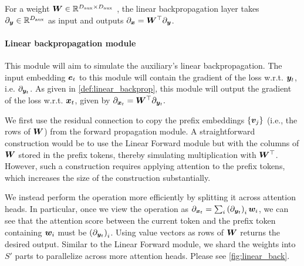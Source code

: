 \begin{definition}\label{def:linear_backprop}
    For a weight ${\bm{W}}\in\mathbb{R}^{ D_{\text{aux}}  \times D_{\text{aux}} }$ , the linear backpropagation layer takes $\partial_{ {\bm{y}} } \in\mathbb{R}^{ D_{\text{aux}} }$ as input and outputs $\partial_{{\bm{x}}} = {\bm{W}}^{\top} \partial_{{\bm{y}}}$.
\end{definition}


\paragraph{\simulator{} Linear backpropagation module} 
This module will aim to simulate the auxiliary's linear backpropagation.
The input embedding $\ve_t$ to this module will contain the gradient of the loss w.r.t. ${\bm{y}}_t$, i.e. $\partial_{  {\bm{y}}_t }$. As given in \cref{def:linear_backprop}, this module will output the gradient of the loss w.r.t. ${\bm{x}}_t$, given by $\partial_{{\bm{x}}_t} = {\bm{W}}^{\top} \partial_{{\bm{y}}_t}.$ 

We first use the residual connection to copy the prefix embeddings $\{ {\bm{v}}_j \}$ (i.e., the rows of ${\bm{W}}$) from the forward propagation module.
A straightforward construction would be to use the Linear Forward module but with the columns of ${\bm{W}}$ stored in the prefix tokens, thereby simulating multiplication with ${\bm{W}}^\top$.
However, such a construction requires applying attention to the prefix tokens, which increases the size of the construction substantially.

We instead perform the operation more efficiently by splitting it across attention heads. In particular, once we view the operation as $\partial_{ {\bm{x}}_t } = \sum_{i} \left(\partial_{ {\bm{y}}_t } \right)_i {\bm{w}}_i$, we can see that the attention score between the current token and the prefix token containing ${\bm{w}}_i$ must be $\left(\partial_{{\bm{y}}_t } \right)_i$. Using value vectors as rows of ${\bm{W}}$ returns the desired output.
Similar to the Linear Forward module, we shard the weights into $S'$ parts to parallelize across more attention heads. Please see \cref{fig:linear_back}.

